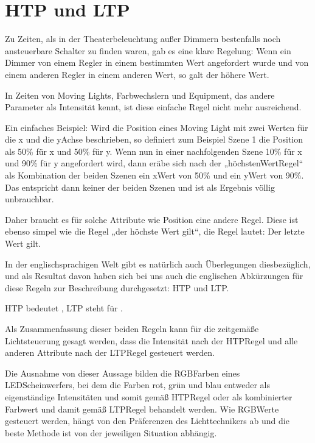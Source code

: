 \documentclass[letterpaper,10pt,ngerman]{sphinxmanual}
\begin{document}
\section{HTP und LTP}
\label{\detokenize{grundlagen:htp-und-ltp}}\label{\detokenize{grundlagen:htpltplabel}}
Zu Zeiten, als in der Theaterbeleuchtung außer Dimmern bestenfalls noch
ansteuerbare Schalter zu finden waren, gab es eine klare Regelung: Wenn
ein Dimmer von einem Regler in einem bestimmten Wert angefordert wurde
und von einem anderen Regler in einem anderen Wert, so galt der höhere Wert.

In Zeiten von Moving Lights, Farbwechslern und Equipment, das andere
Parameter als Intensität kennt, ist diese einfache Regel nicht mehr ausreichend.

Ein einfaches Beispiel: Wird die Position eines Moving Light mit zwei Werten
für die
x\sphinxhyphen{} und die y\sphinxhyphen{}Achse beschrieben, so definiert zum Beispiel Szene 1 die Position
als 50\% für x und 50\% für y. Wenn nun in einer nachfolgenden Szene 10\% für x und
90\% für y angefordert wird, dann eräbe sich nach der „höchsten\sphinxhyphen{}Wert\sphinxhyphen{}Regel“ als
Kombination der beiden Szenen ein x\sphinxhyphen{}Wert von 50\% und ein y\sphinxhyphen{}Wert von 90\%. Das
entspricht dann keiner der beiden Szenen und ist als Ergebnis völlig
unbrauchbar.

Daher braucht es für solche Attribute wie Position eine andere Regel. Diese
ist ebenso simpel wie die Regel „der höchste Wert gilt“, die Regel lautet:
Der letzte Wert gilt.

In der englischsprachigen Welt gibt es natürlich auch Überlegungen
diesbezüglich, und als Resultat davon haben sich bei uns auch die
englischen Abkürzungen für diese Regeln zur Beschreibung durchgesetzt:
HTP und LTP.

HTP bedeutet , LTP steht für
.

Als Zusammenfassung dieser beiden Regeln kann für die zeitgemäße Lichtsteuerung
gesagt werden, dass die Intensität nach der HTP\sphinxhyphen{}Regel und alle anderen
Attribute nach der LTP\sphinxhyphen{}Regel gesteuert werden.

Die Ausnahme von dieser Aussage
bilden die RGB\sphinxhyphen{}Farben eines LED\sphinxhyphen{}Scheinwerfers, bei dem die Farben rot, grün und
blau entweder als eigenständige Intensitäten und somit gemäß HTP\sphinxhyphen{}Regel oder als
kombinierter Farbwert und damit gemäß LTP\sphinxhyphen{}Regel behandelt werden. Wie RGB\sphinxhyphen{}Werte
gesteuert werden, hängt von den Präferenzen des Lichttechnikers ab und die
beste Methode ist von der jeweiligen Situation abhängig.
\end{document}
